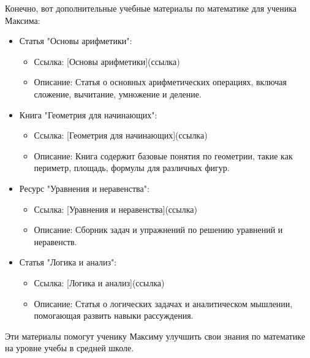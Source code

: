 \documentclass{article}
\begin{document}
Конечно, вот дополнительные учебные материалы по математике для ученика Максима:

\begin{itemize}
    \item Статья "Основы арифметики":
    \begin{itemize}
        \item Ссылка: [Основы арифметики](ссылка)
        \item Описание: Статья о основных арифметических операциях, включая сложение, вычитание, умножение и деление.
    \end{itemize}
    
    \item Книга "Геометрия для начинающих":
    \begin{itemize}
        \item Ссылка: [Геометрия для начинающих](ссылка)
        \item Описание: Книга содержит базовые понятия по геометрии, такие как периметр, площадь, формулы для различных фигур.
    \end{itemize}
    
    \item Ресурс "Уравнения и неравенства":
    \begin{itemize}
        \item Ссылка: [Уравнения и неравенства](ссылка)
        \item Описание: Сборник задач и упражнений по решению уравнений и неравенств.
    \end{itemize}
    
    \item Статья "Логика и анализ":
    \begin{itemize}
        \item Ссылка: [Логика и анализ](ссылка)
        \item Описание: Статья о логических задачах и аналитическом мышлении, помогающая развить навыки рассуждения.
    \end{itemize}
\end{itemize}

Эти материалы помогут ученику Максиму улучшить свои знания по математике на уровне учебы в средней школе.
\end{document}
